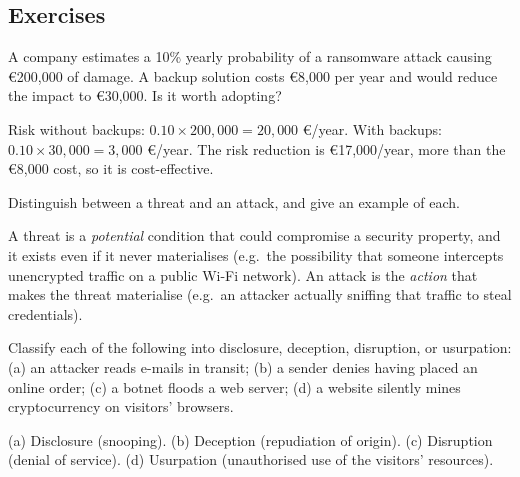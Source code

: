 \subsection*{Exercises}

\begin{exercise}
A company estimates a 10\% yearly probability of a ransomware attack causing €200{,}000 of damage. A backup solution costs €8{,}000 per year and would reduce the impact to €30{,}000. Is it worth adopting?
\end{exercise}
\begin{solution}
Risk without backups: $0.10 \times 200{,}000 = 20{,}000$ €/year. With backups: $0.10 \times 30{,}000 = 3{,}000$ €/year. The risk reduction is €17{,}000/year, more than the €8{,}000 cost, so it is cost-effective.
\end{solution}

\begin{exercise}
Distinguish between a threat and an attack, and give an example of each.
\end{exercise}
\begin{solution}
A threat is a \emph{potential} condition that could compromise a security property, and it exists even if it never materialises (e.g.\ the possibility that someone intercepts unencrypted traffic on a public Wi-Fi network). An attack is the \emph{action} that makes the threat materialise (e.g.\ an attacker actually sniffing that traffic to steal credentials).
\end{solution}

\begin{exercise}
Classify each of the following into disclosure, deception, disruption, or usurpation: (a) an attacker reads e-mails in transit; (b) a sender denies having placed an online order; (c) a botnet floods a web server; (d) a website silently mines cryptocurrency on visitors' browsers.
\end{exercise}
\begin{solution}
(a) Disclosure (snooping). (b) Deception (repudiation of origin). (c) Disruption (denial of service). (d) Usurpation (unauthorised use of the visitors' resources).
\end{solution}

